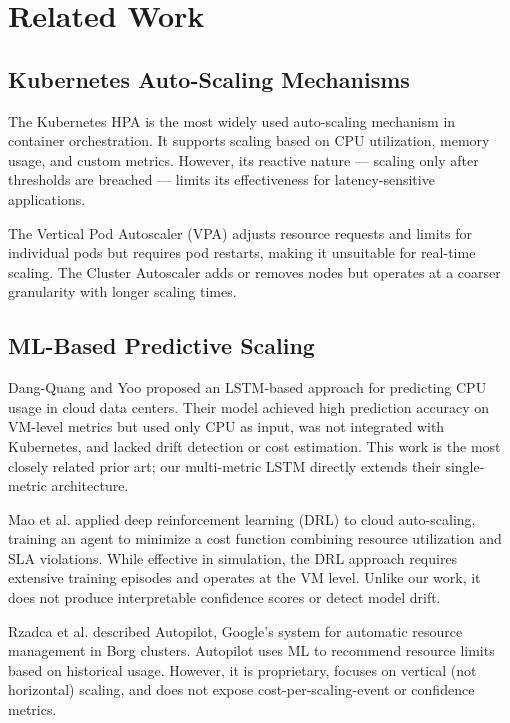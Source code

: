 \documentclass[journal]{IEEEtran}
\begin{document}
\section{Related Work}
\label{sec:related}

\subsection{Kubernetes Auto-Scaling Mechanisms}
The Kubernetes HPA \cite{k8shpa} is the most widely used auto-scaling mechanism in container orchestration. It supports scaling based on CPU utilization, memory usage, and custom metrics. However, its reactive nature --- scaling only after thresholds are breached --- limits its effectiveness for latency-sensitive applications.

The Vertical Pod Autoscaler (VPA) adjusts resource requests and limits for individual pods but requires pod restarts, making it unsuitable for real-time scaling. The Cluster Autoscaler adds or removes nodes but operates at a coarser granularity with longer scaling times.

\subsection{ML-Based Predictive Scaling}
Dang-Quang and Yoo \cite{dangquang2021} proposed an LSTM-based approach for predicting CPU usage in cloud data centers. Their model achieved high prediction accuracy on VM-level metrics but used only CPU as input, was not integrated with Kubernetes, and lacked drift detection or cost estimation. This work is the most closely related prior art; our multi-metric LSTM directly extends their single-metric architecture.

Mao et al. \cite{mao2016} applied deep reinforcement learning (DRL) to cloud auto-scaling, training an agent to minimize a cost function combining resource utilization and SLA violations. While effective in simulation, the DRL approach requires extensive training episodes and operates at the VM level. Unlike our work, it does not produce interpretable confidence scores or detect model drift.

Rzadca et al. \cite{rzadca2020} described Autopilot, Google's system for automatic resource management in Borg clusters. Autopilot uses ML to recommend resource limits based on historical usage. However, it is proprietary, focuses on vertical (not horizontal) scaling, and does not expose cost-per-scaling-event or confidence metrics.
\end{document}

